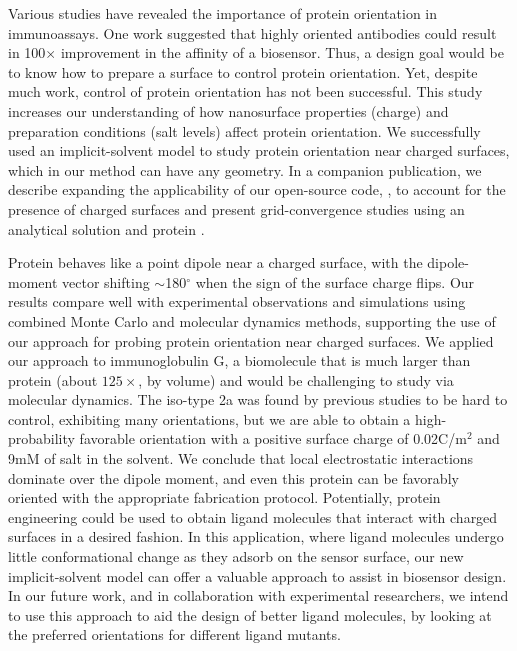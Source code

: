 
Various studies have revealed the importance of protein orientation in immunoassays. One work suggested that highly oriented antibodies could result in 100$\times$ improvement in the affinity of a biosensor.\cite{TajimaTakaiIshihara2011} Thus, a design goal would be to know how to prepare a surface to control protein orientation. Yet, despite much work, control of protein orientation has not been successful.
This study increases our understanding of how nanosurface properties (charge) and preparation conditions (salt levels) affect protein orientation.
We successfully used an implicit-solvent model to study protein orientation near charged surfaces, which in our method can have any geometry. In a companion publication,\cite{CooperBarba2015a} we describe expanding the applicability of our open-source code, \pygbe, to account for the presence of charged surfaces and present grid-convergence studies using an analytical solution and protein \gb. 

Protein \gb behaves like a point dipole near a charged surface, with the dipole-moment vector shifting $\sim$180$^\circ$ when the sign of the surface charge flips. Our results compare well with experimental observations and simulations using combined Monte Carlo and molecular dynamics methods, supporting the use of our approach for probing protein orientation near charged surfaces.
We applied our approach to immunoglobulin G, a biomolecule that is much larger than protein \gb (about $125\times$, by volume) and would be challenging  to study via molecular dynamics. 
The iso-type \ig 2a was found by previous studies to be hard to control, exhibiting many orientations, but we are able to obtain a high-probability favorable orientation with a positive surface charge of 0.02C/m$^{2}$ and 9mM of salt in the solvent. We conclude that local electrostatic interactions dominate over the dipole moment, and even this protein can be favorably oriented with the appropriate fabrication protocol. Potentially, protein engineering could be used to obtain ligand molecules that interact with charged surfaces in a desired fashion.
In this application, where ligand molecules undergo little conformational change as they adsorb on the sensor surface, our new implicit-solvent model can offer a valuable approach to assist in biosensor design. In our future work, and in collaboration with experimental researchers, we intend to use this approach to aid the design of better ligand molecules, by looking at the preferred orientations for different ligand mutants. 
